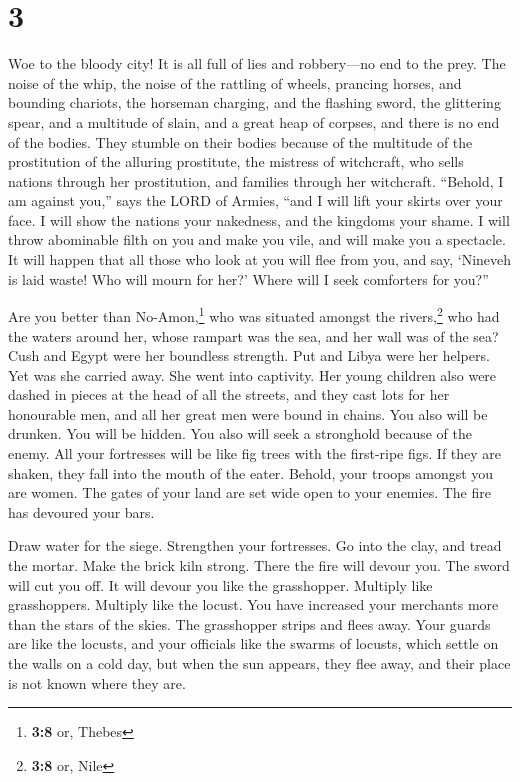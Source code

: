 \hypertarget{section-2}{%
\section{3}\label{section-2}}

 Woe to the bloody city! It is all full of lies and
robbery---no end to the prey.  The noise of the whip, the
noise of the rattling of wheels, prancing horses, and bounding chariots,
 the horseman charging, and the flashing sword, the
glittering spear, and a multitude of slain, and a great heap of corpses,
and there is no end of the bodies. They stumble on their bodies
 because of the multitude of the prostitution of the
alluring prostitute, the mistress of witchcraft, who sells nations
through her prostitution, and families through her witchcraft.
 ``Behold, I am against you,'' says the LORD of Armies,
``and I will lift your skirts over your face. I will show the nations
your nakedness, and the kingdoms your shame.  I will throw
abominable filth on you and make you vile, and will make you a
spectacle.  It will happen that all those who look at you
will flee from you, and say, `Nineveh is laid waste! Who will mourn for
her?' Where will I seek comforters for you?''

 Are you better than No-Amon,\footnote{\textbf{3:8} or,
  Thebes} who was situated amongst the rivers,\footnote{\textbf{3:8} or,
  Nile} who had the waters around her, whose rampart was the sea, and
her wall was of the sea?  Cush and Egypt were her
boundless strength. Put and Libya were her helpers.  Yet
was she carried away. She went into captivity. Her young children also
were dashed in pieces at the head of all the streets, and they cast lots
for her honourable men, and all her great men were bound in chains.
 You also will be drunken. You will be hidden. You also
will seek a stronghold because of the enemy.  All your
fortresses will be like fig trees with the first-ripe figs. If they are
shaken, they fall into the mouth of the eater.  Behold,
your troops amongst you are women. The gates of your land are set wide
open to your enemies. The fire has devoured your bars.

 Draw water for the siege. Strengthen your fortresses. Go
into the clay, and tread the mortar. Make the brick kiln strong.
 There the fire will devour you. The sword will cut you
off. It will devour you like the grasshopper. Multiply like
grasshoppers. Multiply like the locust.  You have
increased your merchants more than the stars of the skies. The
grasshopper strips and flees away.  Your guards are like
the locusts, and your officials like the swarms of locusts, which settle
on the walls on a cold day, but when the sun appears, they flee away,
and their place is not known where they are.

